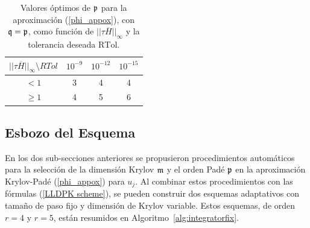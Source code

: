 \begin{table}[htb]
	\caption{Valores óptimos de $\mathfrak{p}$ para la aproximación (\ref{phi_appox}), con $\mathfrak{q}=\mathfrak{p}$, como función de $\lvert\lvert \tau\overline{H} \rvert\rvert_\infty$ y la tolerancia deseada $\mathrm{RTol}$.}
	\begin{center}
		\begin{tabular}{cccc}
			\hline
			$\lvert\lvert \tau\overline{H} \rvert\rvert_\infty \setminus RTol$ & $10^{-9}$ & $10^{-12}$ & $10^{-15}$ \\
			\hline
			$<1$ & 3 & 4 & 4 \\
			$\geq 1$ & 4 & 5 & 6 \\
			\hline
		\end{tabular}
		\label{table:padep}
	\end{center}
\end{table}

\subsection{Esbozo del Esquema}

En los dos sub-secciones anteriores se propusieron procedimientos automáticos para la selección de la dimensión Krylov $\mathfrak{m}$ y el orden Padé $\mathfrak{p}$ en la aproximación Krylov-Padé (\ref{phi_appox}) para $u_j$. Al combinar estos procedimientos con las fórmulas (\ref{LLDPK scheme}), se pueden construir dos esquemas adaptativos con tamaño de paso fijo y dimensión de Krylov variable. Estos esquemas, de orden $r=4$ y $r=5$, están resumidos en Algoritmo~\ref{alg:integratorfix}.

